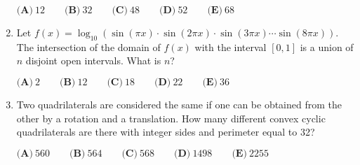 \documentclass{article}
\begin{document}
\begin{enumerate}[label=\arabic*., itemsep=0.5em]
\(\textbf{(A)}\ 12 \qquad \textbf{(B)}\ 32 \qquad \textbf{(C)}\ 48 \qquad \textbf{(D)}\ 52 \qquad \textbf{(E)}\ 68\)\par \vspace{0.5em}\item Let \(f(x) = \log_{10} \left(\sin(\pi x) \cdot \sin(2 \pi x) \cdot \sin (3 \pi x) \cdots \sin(8 \pi x)\right)\). The intersection of the domain of \(f(x)\) with the interval \([0,1]\) is a union of \(n\) disjoint open intervals. What is \(n\)?

\(\textbf{(A)}\ 2 \qquad \textbf{(B)}\ 12 \qquad \textbf{(C)}\ 18 \qquad \textbf{(D)}\ 22 \qquad \textbf{(E)}\ 36\)\par \vspace{0.5em}\item Two quadrilaterals are considered the same if one can be obtained from the other by a rotation and a translation. How many different convex cyclic quadrilaterals are there with integer sides and perimeter equal to 32?

\(\textbf{(A)}\ 560 \qquad \textbf{(B)}\ 564 \qquad \textbf{(C)}\ 568 \qquad \textbf{(D)}\ 1498 \qquad \textbf{(E)}\ 2255\)\par \vspace{0.5em}
\end{enumerate}
\end{document}

